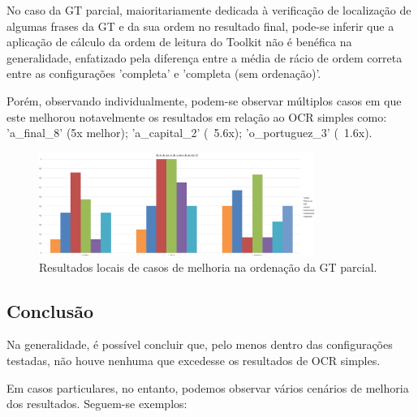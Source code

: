 No caso da GT parcial, maioritariamente dedicada à verificação de localização de algumas frases da GT e da sua ordem no resultado final, pode-se inferir que a aplicação de cálculo da ordem de leitura do Toolkit não é benéfica na generalidade, enfatizado pela diferença entre a média de rácio de ordem correta entre as configurações 'completa' e 'completa (sem ordenação)'. 

Porém, observando individualmente, podem-se observar múltiplos casos em que este melhorou notavelmente os resultados em relação ao OCR simples como: 'a\_final\_8' (5x melhor); 'a\_capital\_2' (~5.6x); 'o\_portuguez\_3' (~1.6x).

\begin{figure}[H]
	\centering
	\includegraphics[width=0.8\textwidth]{images/resultados/local_example_pgt_correct_order_ratio_1.png}
	\caption{Resultados locais de casos de melhoria na ordenação da GT parcial.}
	\label{fig:local_example_pgt_correct_order_ratio_1}
\end{figure}



\subsection{Conclusão}

Na generalidade, é possível concluir que, pelo menos dentro das configurações testadas, não houve nenhuma que excedesse os resultados de OCR simples.

Em casos particulares, no entanto, podemos observar vários cenários de melhoria dos resultados.
Seguem-se exemplos:

